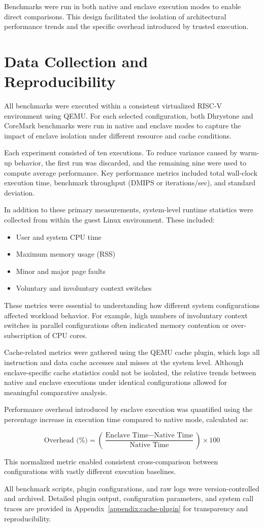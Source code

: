 Benchmarks were run in both native and enclave execution modes to enable direct comparisons. This design facilitated the isolation of architectural performance trends and the specific overhead introduced by trusted execution.

\section{Data Collection and Reproducibility}
\label{sec:data-collection}

All benchmarks were executed within a consistent virtualized RISC-V environment using QEMU. For each selected configuration, both Dhrystone and CoreMark benchmarks were run in native and enclave modes to capture the impact of enclave isolation under different resource and cache conditions.

Each experiment consisted of ten executions. To reduce variance caused by warm-up behavior, the first run was discarded, and the remaining nine were used to compute average performance. Key performance metrics included total wall-clock execution time, benchmark throughput (DMIPS or iterations/sec), and standard deviation.

In addition to these primary measurements, system-level runtime statistics were collected from within the guest Linux environment. These included:

\begin{itemize}
    \item User and system CPU time
    \item Maximum memory usage (RSS)
    \item Minor and major page faults
    \item Voluntary and involuntary context switches
\end{itemize}

These metrics were essential to understanding how different system configurations affected workload behavior. For example, high numbers of involuntary context switches in parallel configurations often indicated memory contention or over-subscription of CPU cores.

Cache-related metrics were gathered using the QEMU cache plugin, which logs all instruction and data cache accesses and misses at the system level. Although enclave-specific cache statistics could not be isolated, the relative trends between native and enclave executions under identical configurations allowed for meaningful comparative analysis.

Performance overhead introduced by enclave execution was quantified using the percentage increase in execution time compared to native mode, calculated as:

\[
\text{Overhead (\%)} = \left( \frac{\text{Enclave Time} - \text{Native Time}}{\text{Native Time}} \right) \times 100
\]

This normalized metric enabled consistent cross-comparison between configurations with vastly different execution baselines.

All benchmark scripts, plugin configurations, and raw logs were version-controlled and archived. Detailed plugin output, configuration parameters, and system call traces are provided in Appendix~\ref{appendix:cache-plugin} for transparency and reproducibility.
